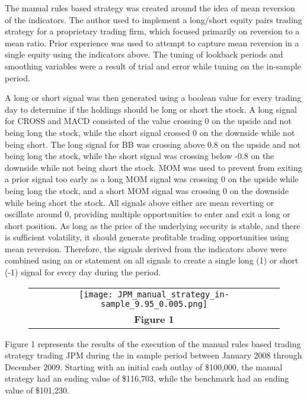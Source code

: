 \documentclass[
	letterpaper, %
]{jdf}
\begin{document}
The manual rules based strategy was created around the idea of mean reversion of the indicators. The author used to implement a long/short equity pairs trading strategy for a proprietary trading firm, which focused primarily on reversion to a mean ratio. Prior experience was used to attempt to capture mean reversion in a single equity using the indicators above. The tuning of lookback periods and smoothing variables were a result of trial and error while tuning on the in-sample period.  

A long or short signal was then generated using a boolean value for every trading day to determine if the holdings should be long or short the stock. A long signal for CROSS and MACD consisted of the value crossing 0 on the upside and not being long the stock, while the short signal crossed 0 on the downside while not being short.  The long signal for BB was crossing above 0.8 on the upside and not being long the stock, while the short signal was crossing below -0.8 on the downside while not being short the stock.  MOM was used to prevent from exiting a prior signal too early as a long MOM signal was crossing 0 on the upside while being long the stock, and a short MOM signal was crossing 0 on the downside while being short the stock.  All signals above either are mean reverting or oscillate around 0, providing multiple opportunities to enter and exit a long or short position.  As long as the price of the underlying security is stable, and there is sufficient volatility, it should generate profitable trading opportunities using mean reversion.  Therefore, the signals derived from the indicators above were combined using an or statement on all signals to create a single long (1) or short (-1) signal for every day during the period.  

\pagebreak

\begin{figure}[h]
	\begin{tabular}{c}
		\texttt{[image: JPM\_manual\_strategy\_in-sample\_9.95\_0.005.png]} \\
		\textbf{Figure 1} \\
	\end{tabular}
\end{figure}


Figure 1 represents the results of the execution of the manual rules based trading strategy trading JPM during the in sample period between January 2008 through December 2009.  Starting with an initial cash outlay of \$100,000, the manual strategy had an ending value of \$116,703, while the benchmark had an ending value of \$101,230.
\end{document}
